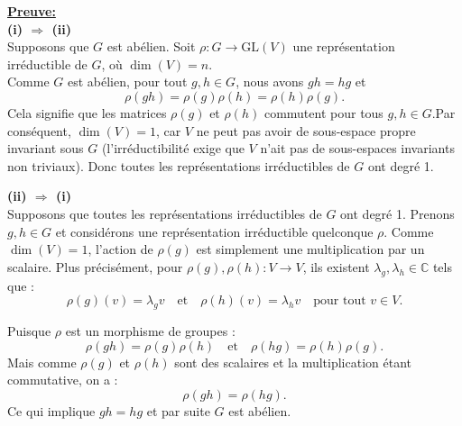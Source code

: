 \documentclass[a4paper, 14pt]{report}
\begin{document}
\begin{onehalfspace}
{			\textbf{\underline{Preuve:}}\\
			\textbf{(i) \(\Rightarrow\) (ii)}\\
			Supposons que \( G \) est abélien. Soit \( \rho : G \to \mathrm{GL}(V) \) une représentation irréductible de \( G \), où \( \dim(V) = n \).\\
			Comme \( G \) est abélien, pour tout \( g, h \in G \), nous avons \( gh = hg \) et 
			\[
			\rho(gh) = \rho(g)\rho(h) = \rho(h)\rho(g).
			\]
			Cela signifie que les matrices \( \rho(g) \) et \( \rho(h) \) commutent pour tous \( g, h \in G \).Par conséquent, \( \dim(V) = 1 \), car \( V \) ne peut pas avoir de sous-espace propre invariant sous \( G \) (l'irréductibilité exige que \( V \) n'ait pas de sous-espaces invariants non triviaux).
			Donc toutes les représentations irréductibles de \( G \) ont degré 1.
			
			\textbf{(ii) \(\Rightarrow\) (i)}\\
			Supposons que toutes les représentations irréductibles de \( G \) ont degré 1. Prenons \( g, h \in G \) et considérons une représentation irréductible quelconque \( \rho \). Comme \( \dim(V) = 1 \), l'action de \( \rho(g) \) est simplement une multiplication par un scalaire. Plus précisément, pour \( \rho(g),\rho(h) : V \to V \), ils existent \( \lambda_g ,\lambda_h \in \mathbb{C} \) tels que :
			\[
			\rho(g)(v) = \lambda_g v \quad \text{et} \quad \rho(h)(v) = \lambda_h v \quad \text{pour tout } v \in V.
			\]
			
			Puisque \( \rho \) est un morphisme de groupes :
			\[
			\rho(gh) = \rho(g)\rho(h) \quad \text{et} \quad \rho(hg) = \rho(h)\rho(g).
			\]
			Mais comme \( \rho(g) \) et \( \rho(h) \) sont des scalaires et la multiplication étant commutative, on a :
			\[
			\rho(gh) = \rho(hg).
			\]
			Ce qui implique \( gh = hg \) et par suite \( G \) est abélien.\\ 
			
			\newpage
			
}
\end{onehalfspace}
\end{document}
